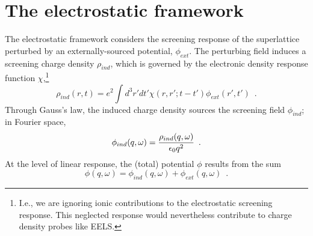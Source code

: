 \section{The electrostatic framework}
\label{section: electrostatic framework}

The electrostatic framework considers the screening response of the superlattice perturbed by an externally-sourced potential, $\phi_{ext}$.  The perturbing field induces a screening charge density $\rho_{ind}$, which is governed by the electronic density response function $\chi$,\footnote{I.e., we are ignoring ionic contributions to the electrostatic screening response.  This neglected response would nevertheless contribute to charge density probes like EELS.}
\begin{equation}
    \label{real space chi def}
    \rho_{ind}(r,t) = e^2\int d^3 r' dt' \chi(r,r';t-t')\phi_{ext}(r',t')
    \,\,\,.
\end{equation}
Through Gauss's law, the induced charge density sources the screening field $\phi_{ind}$; in Fourier space,
\begin{equation}
    \label{Fourier phi ind}
    \phi_{ind}(q,\omega) = \frac{\rho_{ind}(q,\omega)}{\epsilon_0 q^2}
    \,\,\,.
\end{equation}
At the level of linear response, the (total) potential $\phi$ results from the sum
\begin{equation}
    \label{phi def}
    \phi(q,\omega) = \phi_{ind}(q,\omega) + \phi_{ext}(q,\omega)
    \,\,\,.
\end{equation}


